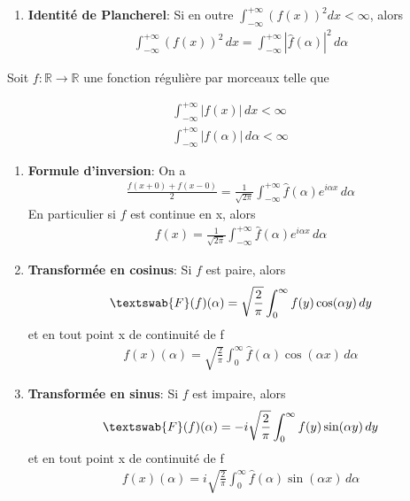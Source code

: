 \begin{myTheorem}
\begin{enumerate}
		\item\textbf{Identité de Plancherel}: Si en outre $\int_{-\infty}^{+\infty}(f(x))^2dx<\infty$, alors
		\begin{eqnarray}
			\int_{-\infty}^{+\infty}(f(x))^2\,dx=\int_{-\infty}^{+\infty}|\hat{f}(\alpha)|^2\,d\alpha
		\end{eqnarray}
	\end{enumerate}
\end{myTheorem}

\begin{myTheorem}
	Soit $f: \mathbb{R}\rightarrow\mathbb{R}$ une fonction régulière par morceaux telle que
	
	\begin{eqnarray*}
		\int_{-\infty}^{+\infty}|f(x)|\,dx<\infty\\
		\int_{-\infty}^{+\infty}|f(\alpha)|\,d\alpha<\infty
	\end{eqnarray*}
	
	
	\begin{enumerate}
		\item \textbf{Formule d'inversion}: On a
		\begin{eqnarray}
			\frac{f(x+0)+f(x-0)}{2}=\frac{1}{\sqrt{2\pi}}\int_{-\infty}^{+\infty}\hat{f}(\alpha)e^{i\alpha x}\,d\alpha
		\end{eqnarray}
		En particulier si $f$ est continue en x, alors
		\begin{eqnarray}
			f(x)=\frac{1}{\sqrt{2\pi}}\int_{-\infty}^{+\infty}\hat{f}(\alpha)e^{i\alpha x}\,d\alpha
		\end{eqnarray}
		
		\item \textbf{Transformée en cosinus}: Si $f$ est paire, alors
		\begin{eqnarray}
			\textswab{F}(f)(\alpha)=\sqrt{\frac{2}{\pi}}\int_0^\infty f(y)\cos(\alpha y)\,dy
		\end{eqnarray}
		et en tout point x de continuité de f
		\begin{eqnarray}
			f(x)(\alpha)=\sqrt{\frac{2}{\pi}}\int_0^\infty \hat{f}(\alpha)\cos(\alpha x)\,d\alpha
		\end{eqnarray}
		
		\item \textbf{Transformée en sinus}: Si $f$ est impaire, alors
		\begin{eqnarray}
			\textswab{F}(f)(\alpha)=-i\sqrt{\frac{2}{\pi}}\int_0^\infty f(y)\sin(\alpha y)\,dy
		\end{eqnarray}
		et en tout point x de continuité de f
		\begin{eqnarray}
			f(x)(\alpha)=i\sqrt{\frac{2}{\pi}}\int_0^\infty \hat{f}(\alpha)\sin(\alpha x)\,d\alpha
		\end{eqnarray}
	\end{enumerate}
\end{myTheorem}